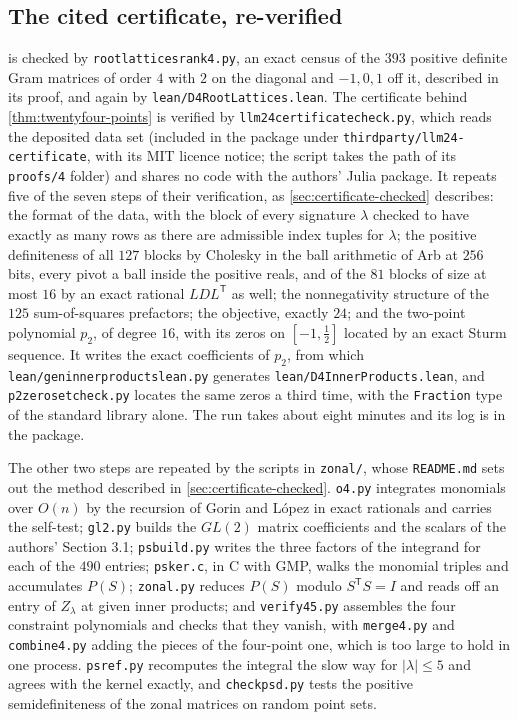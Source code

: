 \documentclass[11pt,reqno]{amsart}
\renewcommand{\_}{\origunderscore\allowbreak}
\numberwithin{equation}{section}
\theoremstyle{plain}
\theoremstyle{definition}
\theoremstyle{remark}
\begin{document}
\subsection*{The cited certificate, re-verified}

 is checked by \texttt{root\_lattices\_rank4.py},
an exact census of the $393$ positive definite Gram matrices of order
$4$ with $2$ on the diagonal and $-1,0,1$ off it, described in its
proof, and again by \texttt{lean/D4RootLattices.lean}. The certificate behind \cref{thm:twentyfour-points} is verified
by \texttt{llm24\_certificate\_check.py}, which reads the deposited data
set \cite{LLM24data} (included in the package under
\texttt{third\_party/llm24-certificate}, with its MIT licence notice; the
script takes the path of its \texttt{proofs/4\_24} folder) and shares no
code with the authors' Julia package. It repeats five of
the seven steps of their verification, as \cref{sec:certificate-checked}
describes: the format of the data, with the block of every signature
$\lambda$ checked to have exactly as many rows as there are admissible
index tuples for $\lambda$; the positive definiteness of all $127$
blocks by Cholesky in the ball arithmetic of Arb \cite{Joh17} at $256$
bits, every pivot a ball inside the positive reals, and of the $81$
blocks of size at most $16$ by an exact rational $LDL^{\mathsf T}$ as
well; the nonnegativity structure of the $125$ sum-of-squares
prefactors; the objective, exactly $24$; and the two-point polynomial
$p_2$, of degree $16$, with its zeros on $[-1,\tfrac12]$ located by an
exact Sturm sequence. It writes the exact coefficients of $p_2$, from
which \texttt{lean/gen\_innerproducts\_lean.py} generates
\texttt{lean/D4InnerProducts.lean}, and \texttt{p2\_zeroset\_check.py}
locates the same zeros a third time, with the \texttt{Fraction} type of
the standard library alone. The run takes about eight minutes and its
log is in the package.

The other two steps are repeated by the scripts in \texttt{zonal/}, whose
\texttt{README.md} sets out the method described in \cref{sec:certificate-checked}.
\texttt{o4.py} integrates monomials over $O(n)$ by the recursion of Gorin
and L\'opez \cite{GL08} in exact rationals and carries the self-test; \texttt{gl2.py} builds the
$GL(2)$ matrix coefficients and the scalars of the authors' Section 3.1;
\texttt{ps\_build.py} writes the three factors of the integrand for each of
the $490$ entries; \texttt{psker.c}, in C with GMP, walks the monomial triples
and accumulates $P(S)$; \texttt{zonal.py} reduces $P(S)$ modulo $S^{\mathsf
T}S=I$ and reads off an entry of $Z_\lambda$ at given inner products; and
\texttt{verify45.py} assembles the four constraint polynomials and checks that
they vanish, with \texttt{merge4.py} and \texttt{combine4.py} adding the
pieces of the four-point one, which is too large to hold in one process.
\texttt{ps\_ref.py} recomputes the integral the slow way for $|\lambda|\le5$
and agrees with the kernel exactly, and \texttt{check\_psd.py} tests the
positive semidefiniteness of the zonal matrices on random point sets.
\end{document}
